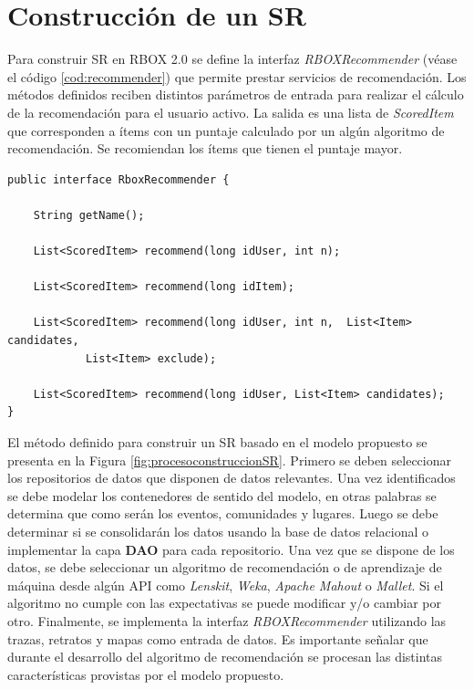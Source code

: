 \section{Construcción de un SR}
\label{sec:consSR}

Para construir SR en RBOX 2.0 se define la interfaz \textit{RBOXRecommender} (véase el código \ref{cod:recommender}) que permite prestar servicios de recomendación. Los métodos definidos reciben distintos parámetros de entrada para realizar el cálculo de la recomendación para el usuario activo. La salida es una lista de \textit{ScoredItem} que corresponden a ítems con un puntaje calculado por un algún algoritmo de recomendación. Se recomiendan los ítems que tienen el puntaje mayor.

\begin{lstlisting}[float, caption = Interfaz RBOXRecommender, label = cod:recommender]
public interface RboxRecommender {
	
    String getName();
    
    List<ScoredItem> recommend(long idUser, int n);
    
    List<ScoredItem> recommend(long idItem); 
    
    List<ScoredItem> recommend(long idUser, int n,  List<Item> candidates,
    		List<Item> exclude);
    
    List<ScoredItem> recommend(long idUser, List<Item> candidates);
}
\end{lstlisting}

El método definido para construir un SR basado en el modelo propuesto se presenta en la Figura \ref{fig:procesoconstruccionSR}. Primero se deben seleccionar los repositorios de datos que disponen de datos relevantes. Una vez identificados se debe modelar los contenedores de sentido del modelo, en otras palabras se determina que como serán los eventos, comunidades y lugares. Luego se debe determinar si se consolidarán los datos usando la base de datos relacional o implementar la capa \textbf{DAO} para cada repositorio. Una vez que se dispone de los datos, se debe seleccionar un algoritmo de recomendación o de aprendizaje de máquina desde algún API como \textit{Lenskit}, \textit{Weka}, \textit{Apache Mahout} o \textit{Mallet}. Si el algoritmo no cumple con las expectativas se puede modificar y/o cambiar por otro. Finalmente, se implementa la interfaz \textit{RBOXRecommender} utilizando las trazas, retratos y mapas como entrada de datos. Es importante señalar que durante el desarrollo del algoritmo de recomendación se procesan las distintas características provistas por el modelo propuesto.

